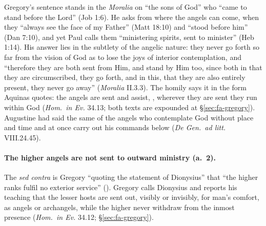 Gregory's sentence stands in the \emph{Moralia} on ``the sons of God'' who
``came to stand before the Lord'' (Job 1:6). He asks from where the angels
can come, when they ``always see the face of my Father'' (Matt 18:10) and
``stood before him'' (Dan 7:10), and yet Paul calls them ``ministering
spirits, sent to minister'' (Heb 1:14). His answer lies in the subtlety of
the angelic nature: they never go forth so far from the vision of God as to
lose the joys of interior contemplation, and ``therefore they are both sent
from Him, and stand by Him too, since both in that they are circumscribed,
they go forth, and in this, that they are also entirely present, they never
go away'' (\emph{Moralia} II.3.3). The homily says it in the form Aquinas
quotes: the angels are sent and assist, , wherever they are sent they run within God
(\emph{Hom.\ in Ev.} 34.13; both texts are expounded at
\S\ref{sec:fa-gregory}). Augustine had said
the same of the angels who contemplate God without place and time and at
once carry out his commands below (\emph{De Gen.\ ad litt.} VIII.24.45).

\paragraph{The higher angels are not sent to outward ministry (a.~2).} The
\emph{sed contra} is Gregory ``quoting the statement of Dionysius'' that
``the higher ranks fulfil no exterior service'' (). Gregory calls Dionysius
 and reports his teaching
that the lesser hosts are sent out, visibly or invisibly, for man's comfort,
as angels or archangels, while the higher never withdraw from the inmost
presence (\emph{Hom.\ in Ev.} 34.12; \S\ref{sec:fa-gregory}).

